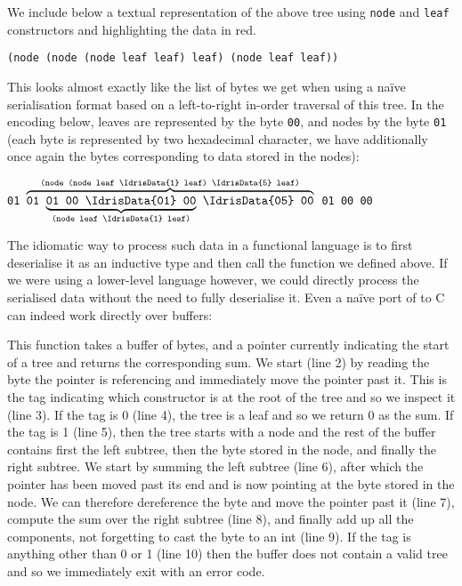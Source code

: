 We include below a textual representation of the above tree using
\texttt{node} and \texttt{leaf} constructors and highlighting the
data in red.

\begin{center}
  \usestt
  \texttt{(node (node (node leaf  leaf)  leaf)  (node leaf  leaf))}
\end{center}

This looks almost exactly like the list of bytes we get when using a
naïve serialisation format based on a left-to-right in-order traversal
of this tree.
%
In the encoding below,
leaves are represented by the byte \texttt{00},
and nodes by the byte \texttt{01}
(each byte is represented by two hexadecimal character,
we have additionally once again  the bytes
corresponding to data stored in the nodes):

\begin{center}
  \usestt
      \texttt{01 $\overbrace{\texttt{01 $\underbrace{\texttt{01 00 \IdrisData{01} 00}}_{\texttt{(node leaf \IdrisData{1} leaf)}}$
    \IdrisData{05} 00}}^{\texttt{(node (node leaf \IdrisData{1} leaf) \IdrisData{5} leaf)}}$
     01 00  00}
\end{center}

The idiomatic way to process such data in a functional language
is to first deserialise it as an inductive type and then call
the  function we defined above.
%
If we were using a lower-level language however, we could directly
process the serialised data without the need to fully deserialise it.
%
Even a naïve port of  to C can indeed work
directly over buffers:

\begin{center}
  \begin{minipage}{\iftoggle{POPL}{.65}{.7}\textwidth}
    {\usestt }
  \end{minipage}
\end{center}

This function takes a buffer of bytes, and
a pointer currently indicating the start of a tree
and returns the corresponding sum.
%
We start (line 2) by reading the byte the pointer is referencing and
immediately move the pointer past it.
%
This is the tag indicating which constructor is at the root of the tree
and so we inspect it (line 3).
%
If the tag is 0 (line 4), the tree is a leaf and so we return $0$ as the sum.
%
If the tag is 1 (line 5), then the tree starts with a node and the rest
of the buffer contains
first the left subtree,
then the byte stored in the node,
and finally the right subtree.
%
We start by summing the left subtree (line 6),
after which the pointer has been moved past its end and is now pointing
at the byte stored in the node.
We can therefore dereference the byte and move the pointer past it (line 7),
compute the sum over the right subtree (line 8),
and finally add up all the components, not forgetting to cast the byte to an int (line 9).
%
If the tag is anything other than 0 or 1 (line 10) then the buffer does not
contain a valid tree and so we immediately exit with an error code.

